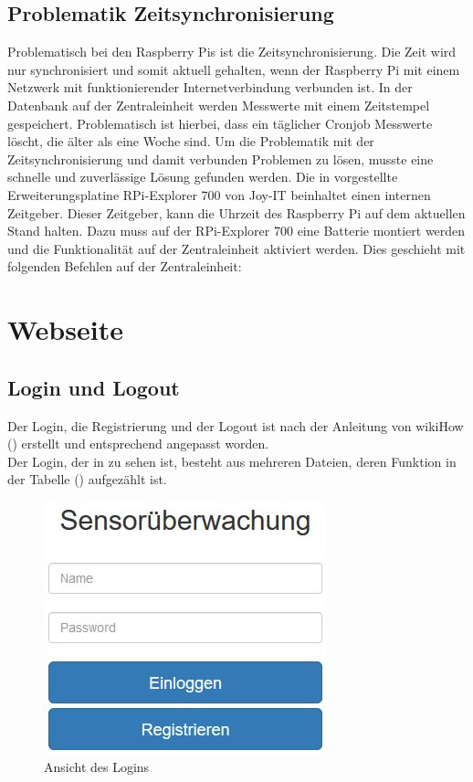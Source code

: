 \subsection{Problematik Zeitsynchronisierung}\label{Zeitsynchronisierung}
Problematisch bei den Raspberry Pis ist die Zeitsynchronisierung. Die Zeit wird nur synchronisiert und somit aktuell gehalten, wenn der Raspberry Pi mit einem Netzwerk mit funktionierender Internetverbindung verbunden ist. In der Datenbank auf der Zentraleinheit werden Messwerte mit einem Zeitstempel gespeichert. Problematisch ist hierbei, dass ein täglicher Cronjob Messwerte löscht, die älter als eine Woche sind. Um die Problematik mit der Zeitsynchronisierung und damit verbunden Problemen zu lösen, musste eine schnelle und zuverlässige Lösung gefunden werden. Die in  vorgestellte Erweiterungsplatine RPi-Explorer 700 von Joy-IT beinhaltet einen internen Zeitgeber. Dieser Zeitgeber, kann die Uhrzeit des Raspberry Pi auf dem aktuellen Stand halten. Dazu muss auf der RPi-Explorer 700 eine Batterie montiert werden und die Funktionalität auf der Zentraleinheit aktiviert werden. Dies geschieht mit folgenden Befehlen auf der Zentraleinheit:
 
\section{Webseite} \label{Webseite}
\subsection{Login und Logout}\label{login}

Der Login, die Registrierung und der Logout ist nach der Anleitung von
wikiHow (\cite{PHP-Login:online}) erstellt und entsprechend angepasst worden. 
\\
Der Login, der in  zu sehen ist, besteht aus mehreren Dateien, deren Funktion in der Tabelle
() aufgezählt ist.

\begin{figure} [htb]
\begin{centering}
\includegraphics{Bilder/Kapitel4/login.jpg}
\caption[Ansicht des Logins]{Ansicht des Logins}
\label{pic:login}
\end{centering}
\end{figure}

